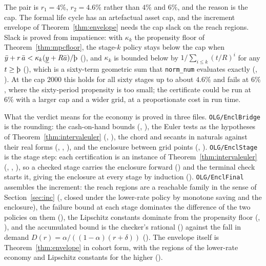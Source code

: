 The pair is $r_1=4\%$, $r_2=4.6\%$ rather than $4\%$ and $6\%$, and the reason is the cap. The
formal life cycle has an artefactual asset cap, and the increment envelope of
Theorem~\ref{thm:envelope} needs the cap slack on the reach regions. Slack is proved from
impatience: with $\kappa_k$ the propensity floor of Theorem~\ref{thm:mpcfloor}, the stage-$k$
policy stays below the cap when
$\bar y+r\,\bar a<\kappa_k(\underline y+R\bar a)/\Thorn$
(), and $\kappa_k$ is bounded below by
$1/\sum_{i\le k}(t/R)^i$ for any $t\ge\Thorn$ (), which
is a sixty-term geometric sum that \texttt{norm\_num} evaluates exactly (,
). At the cap $2000$ this holds for all sixty stages up to about $4.6\%$ and fails
at $6\%$, where the sixty-period propensity is too small; the certificate could be run at $6\%$ with
a larger cap and a wider grid, at a proportionate cost in run time.

What the verdict means for the economy is proved in three files. \texttt{OLG/EnclBridge} is the
rounding: the cash-on-hand bounds (, ), the Euler tests as the
hypotheses of Theorem~\ref{thm:intervaleuler} (,
), the chord and secants in naturals against their real forms
(, , ), and the enclosure between grid
points (, ). \texttt{OLG/EnclStage} is the stage step: each
certification is an instance of Theorem~\ref{thm:intervaleuler} (,
, ), so a checked stage carries the enclosure forward
() and the terminal check starts it, giving the enclosure at every stage by
induction (). \texttt{OLG/EnclFinal} assembles the increment: the reach
regions are a reachable family in the sense of Section~\ref{sec:inc} (, closed
under the lower-rate policy by monotone saving and the enclosure), the failure bound at each stage
dominates the difference of the two policies on them (), the Lipschitz constants
dominate  from the propensity floor (,
), and the accumulated bound is the checker's rational
() against the fall in demand $D(r)=\alpha/((1-\alpha)(r+\delta))$
(). The envelope itself is Theorem~\ref{thm:envelope} in cohort form, with the
regions of the lower-rate economy and Lipschitz constants for the higher
().

